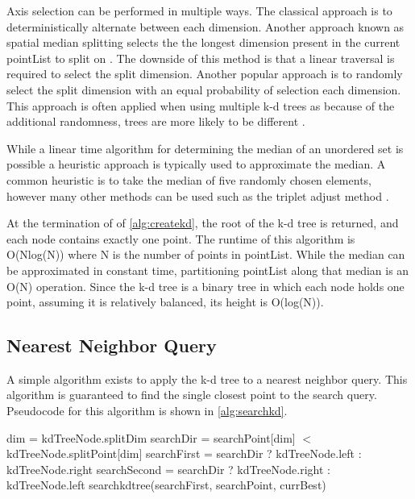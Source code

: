 Axis selection can be performed in multiple ways.  The classical approach is to deterministically alternate between each dimension.  Another approach known as spatial median splitting selects the the longest dimension present in the current pointList to split on \citep{zhou2008real}.  The downside of this method is that a linear traversal is required to select the split dimension.  Another popular approach is to randomly select the split dimension with an equal probability of selection each dimension.  This approach is often applied when using multiple k-d trees as because of the additional randomness, trees are more likely to be different \citep{flann_pami_2014}.

While a linear time algorithm for determining the median of an unordered set is possible \citep{megiddo1984linear} a heuristic approach is typically used to approximate the median.  A common heuristic is to take the median of five randomly chosen elements, however many other methods can be used such as the triplet adjust method \citep{battiato2000efficient}.

At the termination of of \ref{alg:createkd}, the root of the k-d tree is returned, and each node contains exactly one point.  The runtime of this algorithm is O(Nlog(N)) where N is the number of points in pointList.  While the median can be approximated in constant time, partitioning pointList along that median is an O(N) operation.  Since the k-d tree is a binary tree in which each node holds one point, assuming it is relatively balanced, its height is O(log(N)).

\subsection{Nearest Neighbor Query}

A simple algorithm exists to apply the k-d tree to a nearest neighbor query.  This algorithm is guaranteed to find the single closest point to the search query.  Pseudocode for this algorithm is shown in \ref{alg:searchkd}.

\begin{algorithmic}
\label{alg:searchkd}
	\State dim = kdTreeNode.splitDim
	\State searchDir = searchPoint[dim] $<$ kdTreeNode.splitPoint[dim]
	\State searchFirst = searchDir ? kdTreeNode.left : kdTreeNode.right
	\State searchSecond = searchDir ? kdTreeNode.right : kdTreeNode.left
	\State searchkdtree(searchFirst, searchPoint, currBest)
	\State

\EndFunction
\end{algorithmic}

